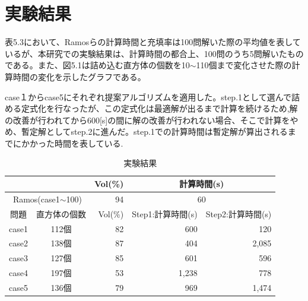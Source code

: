 \documentclass[12pt,fleqn]{jreport}
\begin{document}
\section{実験結果}
表5.3において、Ramosらの計算時間と充填率は100問解いた際の平均値を表しているが、本研究での実験結果は、計算時間の都合上、100問のうち5問解いたものである。また、図5.1は詰め込む直方体の個数を10$\sim$110個まで変化させた際の計算時間の変化を示したグラフである。

case１からcase5にそれぞれ提案アルゴリズムを適用した。step.1として選んで詰める定式化を行なったが、この定式化は最適解が出るまで計算を続けるため,解の改善が行われてから600[s]の間に解の改善が行われない場合、そこで計算をやめ、暫定解としてstep.2に進んだ。step.1での計算時間は暫定解が算出されるまでにかかった時間を表している.
\begin{table}[h]
  \caption{実験結果}
  \begin{center}
    \begin{tabular}{|cc||r|r|r|}
      \hline

                                                   &              & Vol(\%)                  & \multicolumn{2}{|c|}{計算時間(s)}                     \\ \cline{2-3}
      \hline
      \multicolumn{2}{|c||}{Ramos(case1$\sim$100)} & 94           & \multicolumn{2}{|c|}{60}                                                         \\ \cline{2-3}
      \hline
      \hline
      問題                                         & 直方体の個数 & Vol(\%)                  & Step1:計算時間(s)                 & Step2:計算時間(s) \\
      \hline
      case1                                        & 112個        & 82                       & 600                               & 120               \\
      \hline
      case2                                        & 138個        & 87                       & 404                               & 2,085             \\
      \hline
      case3                                        & 127個        & 85                       & 601                               & 596               \\
      \hline
      case4                                        & 197個        & 53                       & 1,238                             & 778               \\
      \hline
      case5                                        & 136個        & 79                       & 969                               & 1,474             \\
      \hline
    \end{tabular}
  \end{center}
  \label{}
\end{table}
\newpage
\end{document}
